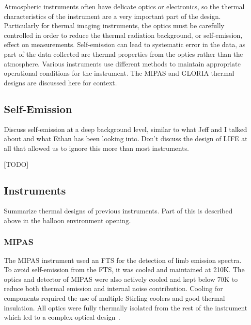 Atmospheric instruments often have delicate optics or electronics, so the thermal characteristics of the instrument are a very important part of the design. Particularly for thermal imaging instruments, the optics must be carefully controlled in order to reduce the thermal radiation background, or self-emission, effect on measurements. Self-emission can lead to systematic error in the data, as part of the data collected are thermal properties from the optics rather than the atmosphere. Various instruments use different methods to maintain appropriate operational conditions for the instrument. The MIPAS and GLORIA thermal designs are discussed here for context. 

\subsection{Self-Emission}
Discuss self-emission at a deep background level, similar to what Jeff and I talked about and what Ethan has been looking into. Don't discuss the design of LIFE at all that allowed us to ignore this more than most instruments.

[TODO]

\subsection{Instruments} \label{GLORIA_MIPAS_thermal}
Summarize thermal designs of previous instruments. Part of this is described above in the balloon environment opening.

\subsubsection{MIPAS}
The MIPAS instrument used an FTS for the detection of limb emission spectra. To avoid self-emission from the FTS, it was cooled and maintained at 210K. The optics and detector of MIPAS were also actively cooled and kept below 70K to reduce both thermal emission and internal noise contribution. Cooling for components required the use of multiple Stirling coolers and good thermal insulation. All optics were fully thermally isolated from the rest of the instrument which led to a complex optical design~\cite{MIPAS_instrument}.

